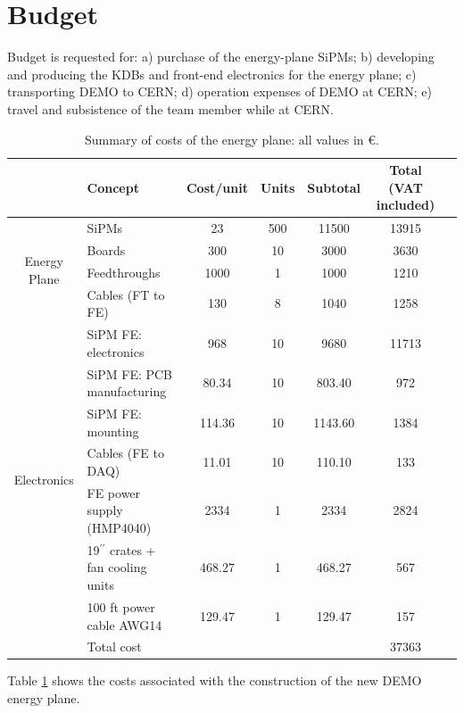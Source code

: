 \section*{Budget}
Budget is requested for: a) purchase of the energy-plane SiPMs; b) developing and producing the KDBs and front-end electronics for the energy plane; c) transporting DEMO to CERN; d) operation expenses of DEMO at CERN; e) travel and subsistence of the team member while at CERN. 
\begin{table}[!h]
 \begin{center}
    \begin{tabular}{|c|l|cccc|c|}
      \hline
      & Concept & Cost/unit & Units & Subtotal &  Total (VAT included)\\
      \hline
      \multirow{4}{*}{Energy Plane} & SiPMs & 23 & 500 & 11500 & 13915\\
      & Boards & 300 & 10 & 3000  & 3630\\
      & Feedthroughs & 1000 & 1 & 1000  & 1210\\
      & Cables (FT to FE) & 130 & 8 & 1040  & 1258\\
      \hline
      \multirow{7}{*}{Electronics} & SiPM FE: electronics & 968 & 10 &
      9680  & 11713\\
      & SiPM FE: PCB manufacturing & 80.34 & 10 & 803.40  & 972\\
      & SiPM FE: mounting & 114.36 & 10 & 1143.60 &  1384\\
      & Cables (FE to DAQ) & 11.01 & 10 & 110.10 &  133\\
      & FE power supply (HMP4040) & 2334 & 1 & 2334 &
      2824\\
      & 19$^{\prime\prime}$ crates + fan cooling units & 468.27 & 1 & 468.27  & 567\\
      & 100 ft power cable AWG14 & 129.47 & 1 & 129.47  & 157\\
      \hline
      & Total cost & & & & 37363 \\
      \hline
    \end{tabular}
    \caption{Summary of costs of the energy plane: all values in \euro.}
    \label{tab:UpCost}
  \end{center}
\end{table}

Table \ref{tab:UpCost} shows the costs associated with the construction of the new DEMO energy plane.

